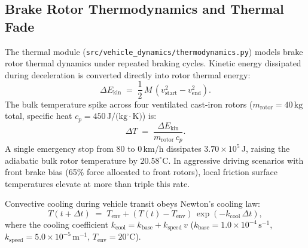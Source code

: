 \documentclass[3p,twocolumn]{elsarticle}
\begin{document}
\subsection{Brake Rotor Thermodynamics and Thermal Fade}
The thermal module (\texttt{src/vehicle\_dynamics/thermodynamics.py}) models brake rotor thermal dynamics under repeated braking cycles. Kinetic energy dissipated during deceleration is converted directly into rotor thermal energy:
\begin{equation}
  \Delta E_{\text{kin}} \;=\; \frac{1}{2}\,M\,\left( v_{\text{start}}^2 - v_{\text{end}}^2 \right).
  \label{eq:ke_diss}
\end{equation}
The bulk temperature spike across four ventilated cast-iron rotors ($m_{\text{rotor}} = 40\,\text{kg}$ total, specific heat $c_p = 450\,\text{J/(kg}\cdot\text{K)}$) is:
\begin{equation}
  \Delta T \;=\; \frac{\Delta E_{\text{kin}}}{m_{\text{rotor}}\,c_p}.
  \label{eq:delta_t}
\end{equation}
A single emergency stop from 80 to 0\,km/h dissipates $3.70 \times 10^5$\,J, raising the adiabatic bulk rotor temperature by $20.58^\circ\text{C}$. In aggressive driving scenarios with front brake bias (65\% force allocated to front rotors), local friction surface temperatures elevate at more than triple this rate.

Convective cooling during vehicle transit obeys Newton's cooling law:
\begin{equation}
  T(t + \Delta t) \;=\; T_{\text{env}} + \left( T(t) - T_{\text{env}} \right)\,\exp(-k_{\text{cool}}\,\Delta t),
  \label{eq:newton_cooling}
\end{equation}
where the cooling coefficient $k_{\text{cool}} = k_{\text{base}} + k_{\text{speed}}\,v$ ($k_{\text{base}} = 1.0 \times 10^{-4}\,\text{s}^{-1}$, $k_{\text{speed}} = 5.0 \times 10^{-5}\,\text{m}^{-1}$, $T_{\text{env}} = 20^\circ\text{C}$).
\end{document}
